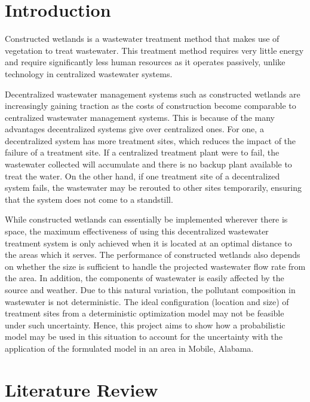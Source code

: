 \documentclass[preprint,12pt,authoryear]{elsarticle}
\begin{document}
 
\section{Introduction}
Constructed wetlands is a wastewater treatment method that makes use of vegetation to treat wastewater. This treatment method requires very little energy and require significantly less human resources as it operates passively, unlike technology in centralized wastewater systems.

Decentralized wastewater management systems such as constructed wetlands are increasingly gaining traction as the costs of construction become comparable to centralized wastewater management systems. This is because of the many advantages decentralized systems give over centralized ones. For one, a decentralized system has more treatment sites, which reduces the impact of the failure of a treatment site. If a centralized treatment plant were to fail, the wastewater collected will accumulate and there is no backup plant available to treat the water. On the other hand, if one treatment site of a decentralized system fails, the wastewater may be rerouted to other sites temporarily, ensuring that the system does not come to a standstill. 

While constructed wetlands can essentially be implemented wherever there is space, the maximum effectiveness of using this decentralized wastewater treatment system is only achieved when it is located at an optimal distance to the areas which it serves. The performance of constructed wetlands also depends on whether the size is sufficient to handle the projected wastewater flow rate from the area. In addition, the components of wastewater is easily affected by the source and weather. Due to this natural variation, the pollutant composition in wastewater is not deterministic. The ideal configuration (location and size) of treatment sites from a deterministic optimization model may not be feasible under such uncertainty. Hence, this project aims to show how a probabilistic model may be used in this situation to account for the uncertainty with the application of the formulated model in an area in Mobile, Alabama. 

\section{Literature Review}
\end{document}
